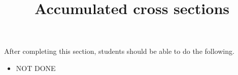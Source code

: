 \documentclass{ximera}
\title{Accumulated cross sections}
\begin{document}
\begin{abstract}
\end{abstract}

\maketitle

\begin{sectionOutcomes}

After completing this section, students should be able to do the following.

\begin{itemize}
\item NOT DONE
\end{itemize}

\end{sectionOutcomes}
\end{document}
